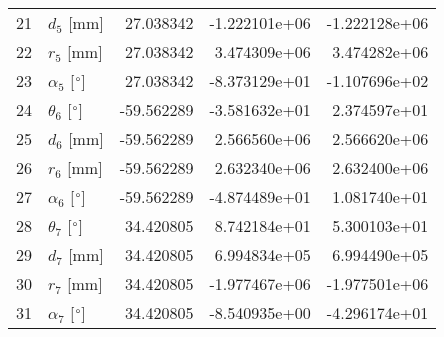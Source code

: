 \documentclass{standalone}%
\begin{document}
\begin{tabular}{llrrr}
21 &              $d_{5}$ [mm] &  27.038342 & -1.222101e+06 & -1.222128e+06 \\
22 &              $r_{5}$ [mm] &  27.038342 &  3.474309e+06 &  3.474282e+06 \\
23 &  $\alpha_{5}$ [$\degree$] &  27.038342 & -8.373129e+01 & -1.107696e+02 \\
24 &  $\theta_{6}$ [$\degree$] & -59.562289 & -3.581632e+01 &  2.374597e+01 \\
25 &              $d_{6}$ [mm] & -59.562289 &  2.566560e+06 &  2.566620e+06 \\
26 &              $r_{6}$ [mm] & -59.562289 &  2.632340e+06 &  2.632400e+06 \\
27 &  $\alpha_{6}$ [$\degree$] & -59.562289 & -4.874489e+01 &  1.081740e+01 \\
28 &  $\theta_{7}$ [$\degree$] &  34.420805 &  8.742184e+01 &  5.300103e+01 \\
29 &              $d_{7}$ [mm] &  34.420805 &  6.994834e+05 &  6.994490e+05 \\
30 &              $r_{7}$ [mm] &  34.420805 & -1.977467e+06 & -1.977501e+06 \\
31 &  $\alpha_{7}$ [$\degree$] &  34.420805 & -8.540935e+00 & -4.296174e+01 \\
\bottomrule
\end{tabular}
%
\end{document}
